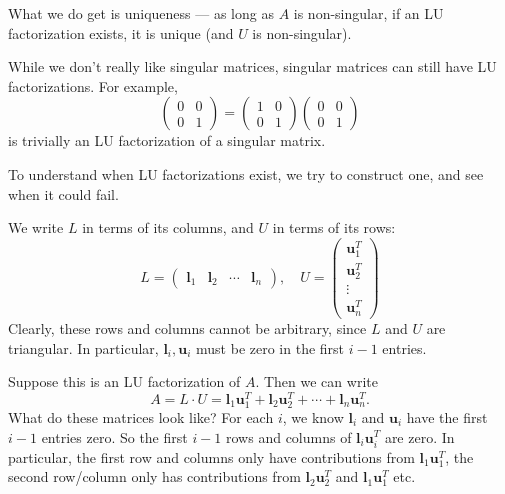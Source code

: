 \documentclass[a4paper]{article}
\begin{document}
What we do get is uniqueness --- as long as $A$ is non-singular, if an LU factorization exists, it is unique (and $U$ is non-singular).

While we don't really like singular matrices, singular matrices can still have LU factorizations. For example,
\[
  \begin{pmatrix}
    0 & 0\\
    0 & 1
  \end{pmatrix}
  =
  \begin{pmatrix}
    1 & 0\\
    0 & 1
  \end{pmatrix}
  \begin{pmatrix}
    0 & 0\\
    0 & 1
  \end{pmatrix}
\]
is trivially an LU factorization of a singular matrix.

To understand when LU factorizations exist, we try to construct one, and see when it could fail.

We write $L$ in terms of its columns, and $U$ in terms of its rows:
\[
  L =
  \begin{pmatrix}
    \mathbf{l}_1 & \mathbf{l}_2 & \cdots & \mathbf{l}_n
  \end{pmatrix},
  \quad
  U =
  \begin{pmatrix}
    \mathbf{u}_1^T\\
    \mathbf{u}_2^T\\
    \vdots\\
    \mathbf{u}_n^T
  \end{pmatrix}
\]
Clearly, these rows and columns cannot be arbitrary, since $L$ and $U$ are triangular. In particular, $\mathbf{l}_i, \mathbf{u}_i$ must be zero in the first $i - 1$ entries.

Suppose this is an LU factorization of $A$. Then we can write
\[
  A = L\cdot U = \mathbf{l}_1 \mathbf{u}_1^T + \mathbf{l}_2 \mathbf{u}_2^T + \cdots + \mathbf{l}_n \mathbf{u}_n^T.
\]
What do these matrices look like? For each $i$, we know $\mathbf{l}_i$ and $\mathbf{u}_i$ have the first $i - 1$ entries zero. So the first $i - 1$ rows and columns of $\mathbf{l}_i \mathbf{u}_i^T$ are zero. In particular, the first row and columns only have contributions from $\mathbf{l}_1\mathbf{u}_1^T$, the second row/column only has contributions from $\mathbf{l}_2 \mathbf{u}_2^T$ and $\mathbf{l}_1 \mathbf{u}_1^T$ etc.
\end{document}
